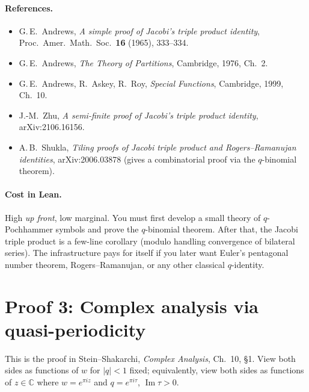 \paragraph{References.}
\begin{itemize}\item G.\,E.\ Andrews, \emph{A simple proof of Jacobi's triple product identity}, Proc.~Amer.~Math.~Soc.\ \textbf{16} (1965), 333--334.
\item G.\,E.\ Andrews, \emph{The Theory of Partitions}, Cambridge, 1976, Ch.\ 2.
\item G.\,E.\ Andrews, R.\ Askey, R.\ Roy, \emph{Special Functions}, Cambridge, 1999, Ch.\ 10.
\item J.-M.\ Zhu, \emph{A semi-finite proof of Jacobi's triple product identity}, arXiv:2106.16156.
\item A.\,B.\ Shukla, \emph{Tiling proofs of Jacobi triple product and Rogers--Ramanujan identities}, arXiv:2006.03878 (gives a combinatorial proof via the $q$-binomial theorem).
\end{itemize}

\paragraph{Cost in Lean.} High \emph{up front}, low marginal. You must first develop a small theory of $q$-Pochhammer symbols and prove the $q$-binomial theorem. After that, the Jacobi triple product is a few-line corollary (modulo handling convergence of bilateral series). The infrastructure pays for itself if you later want Euler's pentagonal number theorem, Rogers--Ramanujan, or any other classical $q$-identity.

\section{Proof 3: Complex analysis via quasi-periodicity}
\label{sec:complex}

This is the proof in Stein--Shakarchi, \emph{Complex Analysis}, Ch.\ 10, \S 1. View both sides as functions of $w$ for $|q| < 1$ fixed; equivalently, view both sides as functions of $z \in \mathbb{C}$ where $w = e^{\pi i z}$ and $q = e^{\pi i \tau}$, $\operatorname{Im} \tau > 0$.

